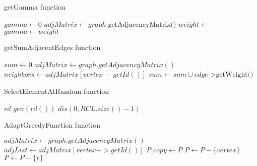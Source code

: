 \begin{algorithm}[H]
    \caption{getGamma function}
    \label{getGamma-pseudocode}
    \begin{algorithmic}[1]
            \State $gamma \gets $0
            \State $adjMatrix \gets graph.\text{getAdjacencyMatrix()}$
                \State $weight \gets $
                    \State $gamma \gets weight$
                \EndIf
            \EndFor
            \State {}
        \EndProcedure
    \end{algorithmic}
\end{algorithm}

\begin{algorithm}[H]
    \caption{getSumAdjacentEdges function}
    \label{getSumAdjacentEdges-pseudocode}
    \begin{algorithmic}[1]
            \State $sum \gets 0$
            \State $adjMatrix \gets graph.getAdjacencyMatrix()$
            \State $neighbors \gets adjMatrix[vertex-\>getId()]$
                \State $sum \gets sum \cup edge\text{->getWeight()}$
            \EndFor
            \State {}
        \EndProcedure
    \end{algorithmic}
\end{algorithm}

\begin{algorithm}[H]
    \caption{SelectElementAtRandom function}
    \label{SelectElementAtRandom-pseudocode}
    \begin{algorithmic}[1]
            \State $rd$
            \State $gen(rd())$
            \State $dis(0, RCL.size() - 1)$
            \State {}
        \EndProcedure
    \end{algorithmic}
\end{algorithm}

\begin{algorithm}[H]
    \caption{AdaptGreedyFunction function}
    \label{AdaptGreedyFunction-pseudocode}
    \begin{algorithmic}[1]
            \State $adjMatrix \gets graph.getAdjacencyMatrix()$
            \State $adjList \gets adjMatrix[vertex->getId()]$
            \State $P\_copy \gets P$
            \State $P \gets P - \lbrace vertex \rbrace$
                    \State $P \gets P - \lbrace v \rbrace$
                \EndIf
            \EndFor
        \EndProcedure
    \end{algorithmic}
\end{algorithm}

